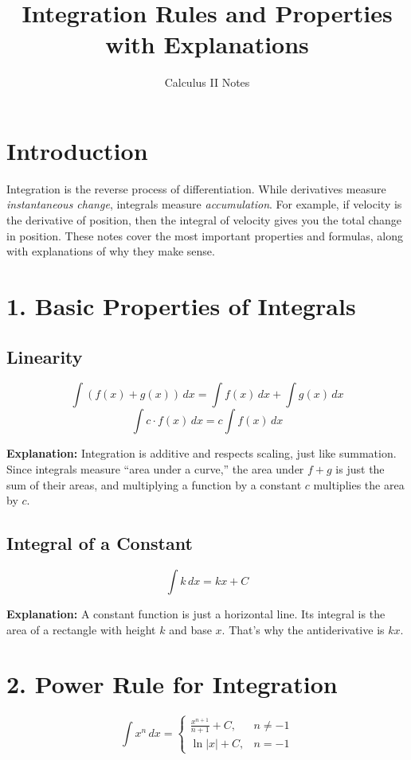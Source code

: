 \documentclass[12pt]{article}
\title{Integration Rules and Properties with Explanations}
\author{Calculus II Notes}
\date{}
\begin{document}
\maketitle

\section*{Introduction}
Integration is the reverse process of differentiation. While derivatives measure \textit{instantaneous change}, integrals measure \textit{accumulation}. 
For example, if velocity is the derivative of position, then the integral of velocity gives you the total change in position. 
These notes cover the most important properties and formulas, along with explanations of why they make sense. 

\section*{1. Basic Properties of Integrals}

\subsection*{Linearity}
\[
\int (f(x) + g(x)) \, dx = \int f(x) \, dx + \int g(x)\, dx
\]
\[
\int c \cdot f(x)\, dx = c \int f(x)\, dx
\]

\textbf{Explanation:} Integration is additive and respects scaling, just like summation. Since integrals measure ``area under a curve,'' the area under $f+g$ is just the sum of their areas, and multiplying a function by a constant $c$ multiplies the area by $c$. 

\subsection*{Integral of a Constant}
\[
\int k \, dx = kx + C
\]

\textbf{Explanation:} A constant function is just a horizontal line. Its integral is the area of a rectangle with height $k$ and base $x$. That’s why the antiderivative is $kx$. 

\section*{2. Power Rule for Integration}

\[
\int x^n \, dx = 
\begin{cases}
\frac{x^{n+1}}{n+1} + C, & n \neq -1 \\
\ln|x| + C, & n = -1
\end{cases}
\]
\end{document}
